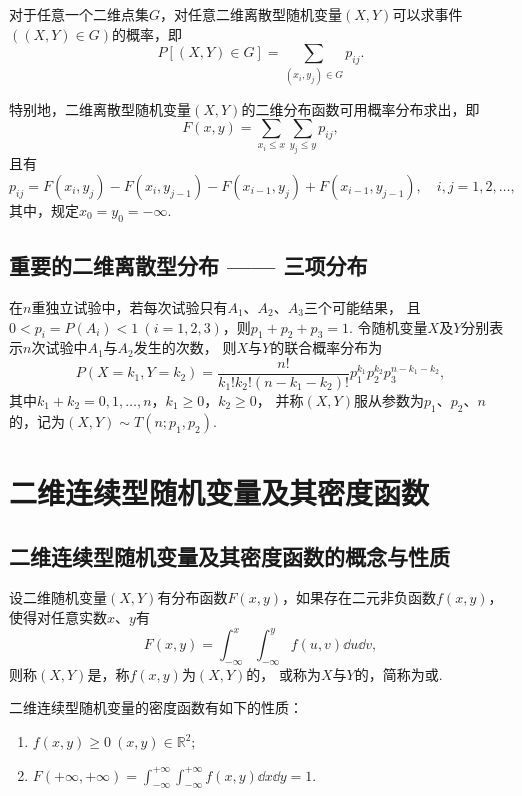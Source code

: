 \begin{theorem}
对于任意一个二维点集\(G\)，对任意二维离散型随机变量\((X,Y)\)可以求事件\(((X,Y) \in G)\)的概率，即\[
P\left[(X,Y) \in G\right] = \sum_{(x_i,y_j) \in G} p_{ij}.
\]

特别地，二维离散型随机变量\((X,Y)\)的二维分布函数可用概率分布求出，即\[
F(x,y) = \sum_{x_i \leq x}\sum_{y_j \leq y} p_{ij},
\]且有\[
p_{ij} = F(x_i,y_j) - F(x_i,y_{j-1}) - F(x_{i-1},y_j) + F(x_{i-1},y_{j-1}), \quad i,j = 1,2,\dotsc,
\]其中，规定\(x_0 = y_0 = -\infty\).
\end{theorem}

\subsection{重要的二维离散型分布 —— 三项分布}
\begin{definition}
在\(n\)重独立试验中，若每次试验只有\(A_1\)、\(A_2\)、\(A_3\)三个可能结果，
且\(0 < p_i = P(A_i) < 1\ (i=1,2,3)\)，则\(p_1 + p_2 + p_3 = 1\).
令随机变量\(X\)及\(Y\)分别表示\(n\)次试验中\(A_1\)与\(A_2\)发生的次数，
则\(X\)与\(Y\)的联合概率分布为\[
P(X=k_1,Y=k_2) = \frac{n!}{k_1! k_2! (n-k_1-k_2)!} p_1^{k_1} p_2^{k_2} p_3^{n-k_1-k_2},
\]其中\(k_1+k_2 = 0,1,\dotsc,n\)，\(k_1 \geq 0\)，\(k_2 \geq 0\)，
并称\((X,Y)\)服从参数为\(p _1\)、\(p_2\)、\(n\)的，记为\((X,Y) \sim T(n;p_1,p_2)\).
\end{definition}

\section{二维连续型随机变量及其密度函数}

\subsection{二维连续型随机变量及其密度函数的概念与性质}

\begin{definition}
设二维随机变量\((X,Y)\)有分布函数\(F(x,y)\)，如果存在二元非负函数\(f(x,y)\)，使得对任意实数\(x\)、\(y\)有\[
F(x,y) = \int_{-\infty}^x \int_{-\infty}^y f(u,v) \dd{u} \dd{v},
\]则称\((X,Y)\)是，称\(f(x,y)\)为\((X,Y)\)的，
或称为\(X\)与\(Y\)的，简称为或.
\end{definition}

\begin{property}
二维连续型随机变量的密度函数有如下的性质：
\begin{enumerate}
\item \(f(x,y) \geq 0\ (x,y)\in\mathbb{R}^2\);
\item \(F(+\infty,+\infty) = \int_{-\infty}^{+\infty} \int_{-\infty}^{+\infty} f(x,y) \dd{x} \dd{y} = 1\).
\end{enumerate}
\end{property}


